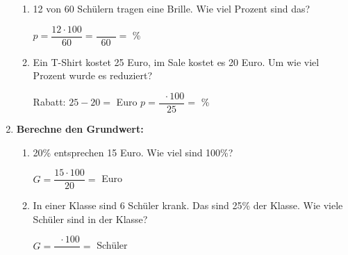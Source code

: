 \begin{enumerate}[label=\arabic*., resume]
    \begin{enumerate}[label=\alph*)]
        \item 12 von 60 Schülern tragen eine Brille. Wie viel Prozent sind das?

        \vspace{0.3cm}
        $p = \dfrac{12 \cdot 100}{60} = \dfrac{\phantom{0000}}{60} = $ \underline{\hspace{2cm}} \%

        \vspace{0.5cm}

        \item Ein T-Shirt kostet 25 Euro, im Sale kostet es 20 Euro. Um wie viel Prozent wurde es reduziert?

        \vspace{0.3cm}
        Rabatt: $25 - 20 = $ \underline{\hspace{2cm}} Euro
        \vspace{0.3cm}
        $p = \dfrac{\phantom{0} \cdot 100}{25} = $ \underline{\hspace{2cm}} \%

    \end{enumerate}

    \vspace{1cm}

    \item \textbf{Berechne den Grundwert:}

    \vspace{0.5cm}

    \begin{enumerate}[label=\alph*)]
        \item 20\% entsprechen 15 Euro. Wie viel sind 100\%?

        \vspace{0.3cm}
        $G = \dfrac{15 \cdot 100}{20} = $ \underline{\hspace{2cm}} Euro

        \vspace{0.5cm}

        \item In einer Klasse sind 6 Schüler krank. Das sind 25\% der Klasse. Wie viele Schüler sind in der Klasse?

        \vspace{0.3cm}
        $G = \dfrac{\phantom{0} \cdot 100}{\phantom{00}} = $ \underline{\hspace{2cm}} Schüler

    \end{enumerate}


\end{enumerate}
